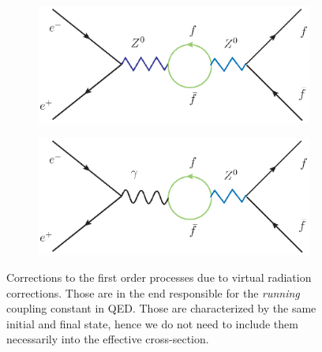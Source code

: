 \begin{figure}[htpb]
\centering
\begin{subfigure}{.5\textwidth}
  \centering
  \includegraphics[width=1.0\linewidth]{figures/corr3}
  \label{fig:sub1}
\end{subfigure}%
\begin{subfigure}{.5\textwidth}
  \centering
  \includegraphics[width=1.0\linewidth]{figures/corr4}
  \label{fig:sub2}
\end{subfigure}
\caption{Corrections to the first order processes due to virtual radiation corrections. Those are in the end responsible
for the \textit{running} coupling constant in QED. Those are characterized by the same initial and final state, hence we
do not need to include them necessarily into the effective cross-section.}
\label{fig:photonic2}
\end{figure}

